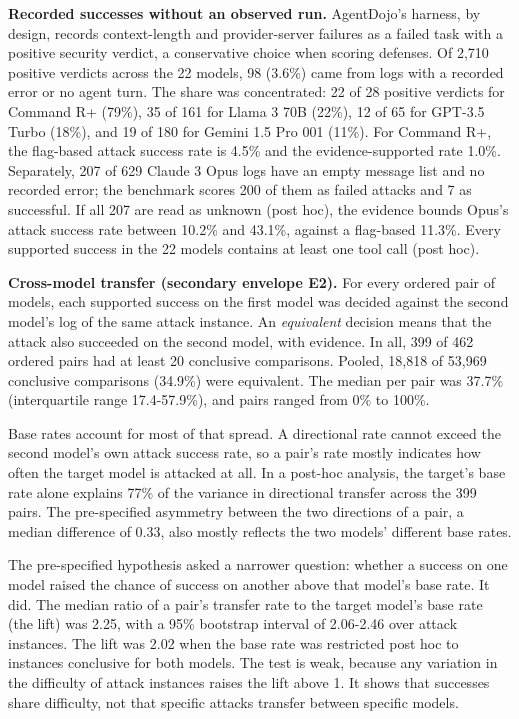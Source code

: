 \documentclass[
  american,
  10pt,
  a4paper,
]{article}
\begin{document}
\textbf{Recorded successes without an observed run.} AgentDojo's
harness, by design, records context-length and provider-server failures
as a failed task with a positive security verdict, a conservative choice
when scoring defenses. Of 2,710 positive verdicts across the 22 models,
98 (3.6\%) came from logs with a recorded error or no agent turn. The
share was concentrated: 22 of 28 positive verdicts for Command R+
(79\%), 35 of 161 for Llama 3 70B (22\%), 12 of 65 for GPT-3.5 Turbo
(18\%), and 19 of 180 for Gemini 1.5 Pro 001 (11\%). For Command R+, the
flag-based attack success rate is 4.5\% and the evidence-supported rate
1.0\%. Separately, 207 of 629 Claude 3 Opus logs have an empty message
list and no recorded error; the benchmark scores 200 of them as failed
attacks and 7 as successful. If all 207 are read as unknown (post hoc),
the evidence bounds Opus's attack success rate between 10.2\% and
43.1\%, against a flag-based 11.3\%. Every supported success in the 22
models contains at least one tool call (post hoc).

\textbf{Cross-model transfer (secondary envelope E2).} For every ordered
pair of models, each supported success on the first model was decided
against the second model's log of the same attack instance. An
\emph{equivalent} decision means that the attack also succeeded on the
second model, with evidence. In all, 399 of 462 ordered pairs had at
least 20 conclusive comparisons. Pooled, 18,818 of 53,969 conclusive
comparisons (34.9\%) were equivalent. The median per pair was 37.7\%
(interquartile range 17.4-57.9\%), and pairs ranged from 0\% to 100\%.

Base rates account for most of that spread. A directional rate cannot
exceed the second model's own attack success rate, so a pair's rate
mostly indicates how often the target model is attacked at all. In a
post-hoc analysis, the target's base rate alone explains 77\% of the
variance in directional transfer across the 399 pairs. The pre-specified
asymmetry between the two directions of a pair, a median difference of
0.33, also mostly reflects the two models' different base rates.

The pre-specified hypothesis asked a narrower question: whether a
success on one model raised the chance of success on another above that
model's base rate. It did. The median ratio of a pair's transfer rate to
the target model's base rate (the lift) was 2.25, with a 95\% bootstrap
interval of 2.06-2.46 over attack instances. The lift was 2.02 when the
base rate was restricted post hoc to instances conclusive for both
models. The test is weak, because any variation in the difficulty of
attack instances raises the lift above 1. It shows that successes share
difficulty, not that specific attacks transfer between specific models.
\end{document}
